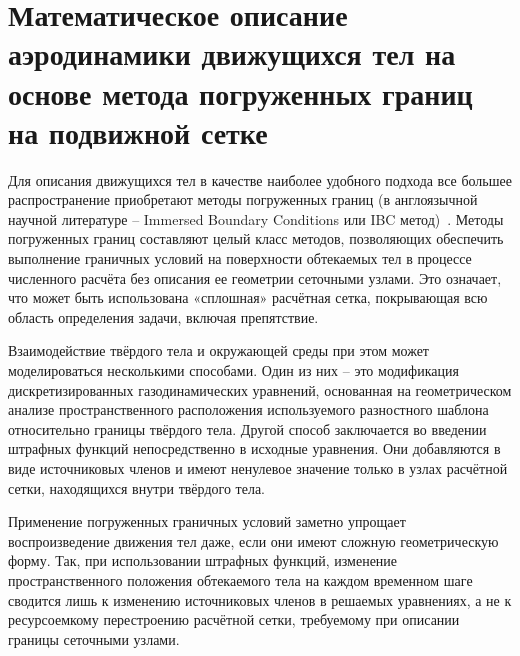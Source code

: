 \chapter{Математическое описание аэродинамики движущихся тел на основе метода погруженных границ на подвижной сетке} \label{app:A}
Для описания движущихся тел в качестве наиболее удобного подхода все большее распространение приобретают методы погруженных границ (в англоязычной научной литературе – Immersed Boundary Conditions или IBC метод)~\cite{mittal2005immersed, boiron2009high, brown2014characteristic}.
Методы погруженных границ составляют целый класс методов, позволяющих обеспечить выполнение граничных условий на поверхности обтекаемых тел в процессе численного расчёта без описания ее геометрии сеточными узлами. Это означает, что может быть использована «сплошная» расчётная сетка, покрывающая всю область определения задачи, включая препятствие. 

Взаимодействие твёрдого тела и окружающей среды при этом может моделироваться несколькими способами. Один из них – это модификация дискретизированных газодинамических уравнений, основанная на геометрическом анализе пространственного расположения используемого разностного шаблона относительно границы твёрдого тела. Другой способ заключается во введении штрафных функций непосредственно в исходные уравнения. Они добавляются в виде источниковых членов и имеют ненулевое значение только в узлах расчётной сетки, находящихся внутри твёрдого тела.

Применение погруженных граничных условий заметно упрощает воспроизведение движения тел даже, если они имеют сложную геометрическую форму. Так, при использовании штрафных функций, изменение пространственного положения обтекаемого тела на каждом временном шаге сводится лишь к изменению источниковых членов в решаемых уравнениях, а не к ресурсоемкому перестроению расчётной сетки, требуемому при описании границы сеточными узлами.

